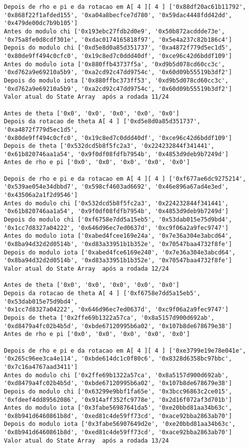 \documentclass[12pt, a4paper]{article}
\begin{document}
\begin{enumerate}
\begin{enumerate}
\begin{verbatim}
Depois de rho e pi e da rotacao em A[ 4 ][ 4 ] ['0x88df20ac61b11792',
'0x868f22f1afded155', '0xa04a8becfce7d780', '0x59dac4448fdd42dd',
'0x479de00dc7b9b105']
Antes do modulo chi ['0x193ebc27fdb2d0e9', '0x50b872acddde73e',
'0x75a8fe0d8cdf301e', '0xdac0174165818f97', '0x5e4a237c82b186c4']
Depois do modulo chi ['0xd5e8d0a85d351737', '0xa4872f779d5ec1d5',
'0x80de9ff494c0cfc0', '0x19c8ed7c0ddd40df', '0xce96c42d6bddf109']
Antes do modulo iota ['0x880ffb43737f5a', '0xd9b5d078cd60cc3c',
'0xd762a9e69210a5b9', '0xa2cd92c47dd9754c', '0x60d09b55519b3df2']
Depois do modulo iota ['0x880ffbc373ff53', '0xd9b5d078cd60cc3c',
'0xd762a9e69210a5b9', '0xa2cd92c47dd9754c', '0x60d09b55519b3df2']
Valor atual do State Array  após a rodada 11/24

Antes de theta ['0x0', '0x0', '0x0', '0x0', '0x0']
Depois da rotacao de theta A[ 4 ] ['0xd5e8d0a85d351737', '0xa4872f779d5ec1d5',
'0x80de9ff494c0cfc0', '0x19c8ed7c0ddd40df', '0xce96c42d6bddf109']
Depois de theta ['0x532dcd5b8f5fc2a3', '0x224232844f341441',
'0x61b820746aa1a54', '0x9f0df08fdfb7954b', '0x4853d9deb9b7249d']
Antes de rho e pi ['0x0', '0x0', '0x0', '0x0', '0x0']

Depois de rho e pi e da rotacao em A[ 4 ][ 4 ] ['0xf677ae6dc9275214',
'0x539ae054e34dbbd7', '0x598cf4603ad6692', '0x46e896a67ad4e3ed',
'0x43506a2a1f2d9546']
Antes do modulo chi ['0x532dcd5b8f5fc2a3', '0x224232844f341441',
'0x61b820746aa1a54', '0x9f0df08fdfb7954b', '0x4853d9deb9b7249d']
Depois do modulo chi ['0xf6758e7dd5a15eb5', '0x53dab015e75d9bd4',
'0x1cc7d8327a04222', '0x646d96ec7ed0637d', '0xc9f06a2a9fec9747']
Antes do modulo iota ['0xabed4fcee169e24a', '0x7e36a304e3abcd64',
'0x8ba94d32d2d0514b', '0xd83a33951b1b352e', '0x70547baa4732f8fe']
Depois do modulo iota ['0xabed4fce6169e240', '0x7e36a304e3abcd64',
'0x8ba94d32d2d0514b', '0xd83a33951b1b352e', '0x70547baa4732f8fe']
Valor atual do State Array  após a rodada 12/24

Antes de theta ['0x0', '0x0', '0x0', '0x0', '0x0']
Depois da rotacao de theta A[ 4 ] ['0xf6758e7dd5a15eb5', '0x53dab015e75d9bd4',
'0x1cc7d8327a04222', '0x646d96ec7ed0637d', '0xc9f06a2a9fec9747']
Depois de theta ['0x2ffe69b1322a57ca', '0x8a5157d900d692ab',
'0xd8479a4fc02b4b5d', '0xbde67120995b6a02', '0x107b8de678679e38']
Antes de rho e pi ['0x0', '0x0', '0x0', '0x0', '0x0']

Depois de rho e pi e da rotacao em A[ 4 ][ 4 ] ['0xe3799e19e78e041e',
'0x265c96ee3ca4e114', '0xbde614dc1c0f80c6', '0x8328d6358bc97bbc',
'0x7c16a4767aad3411']
Antes do modulo chi ['0x2ffe69b1322a57ca', '0x8a5157d900d692ab',
'0xd8479a4fc02b4b5d', '0xbde67120995b6a02', '0x107b8de678679e38']
Depois do modulo chi ['0x63299e9bbf1fa65e', '0x3bcc96863c2ce015',
'0xfdeef4dd89562086', '0x914aff352fc9778e', '0x2d16f072af3d701b']
Antes do modulo iota ['0x3fabe56987641da5', '0xe20bbd81aa34b63c',
'0x8b941d6460861b8d', '0xed81c4de59ff73cd', '0xace92bba2863ab70']
Depois do modulo iota ['0x3fabe56907649d2e', '0xe20bbd81aa34b63c',
'0x8b941d6460861b8d', '0xed81c4de59ff73cd', '0xace92bba2863ab70']
Valor atual do State Array  após a rodada 13/24


\end{verbatim}
\end{enumerate}
\end{enumerate}
\end{document}
